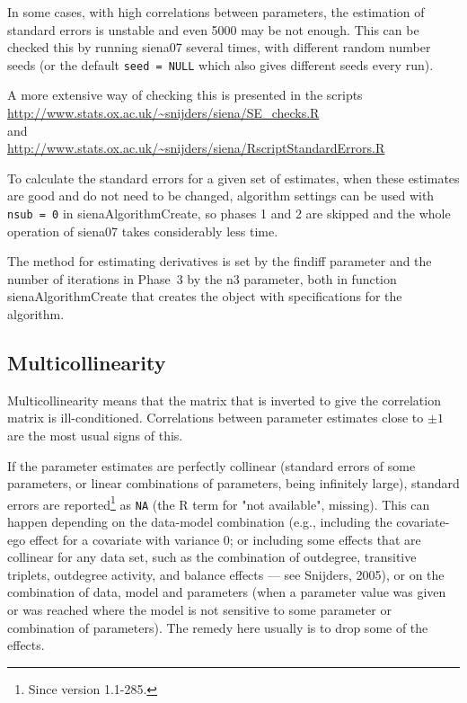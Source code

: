 \documentclass[a4paper,fleqn,11pt]{article}
\newcommand{\+}{\, + \,}
\newcommand{\sfn}[1]{\textsf{#1}}
\begin{document}
In some cases, with high correlations between parameters,
the estimation of standard errors is unstable and even 5000 may be not enough.
This can be checked this by running \textsf{siena07} several times, with different
random number seeds (or the default \texttt{seed = NULL} which also gives different
seeds every run).

A more extensive way of checking this is presented in the scripts\\
{\url{http://www.stats.ox.ac.uk/~snijders/siena/SE_checks.R}~} \\
and \\
{\url{http://www.stats.ox.ac.uk/~snijders/siena/RscriptStandardErrors.R}~}
\medskip


To calculate the standard errors for a
given set of estimates, when these estimates are good and do not need to be changed,
algorithm settings can be used with \texttt{nsub = 0}
in \textsf{sienaAlgorithmCreate}, so phases 1 and 2 are
skipped and the whole operation of \textsf{siena07} takes considerably less time.
\medskip

The method for estimating derivatives is set
by the \sfn{findiff} parameter and the number of iterations in Phase~3
by the \sfn{n3} parameter, both in function \textsf{sienaAlgorithmCreate}
that creates the object with specifications for the algorithm.

\subsection{Multicollinearity}

Multicollinearity means that the matrix that is inverted
to give the correlation matrix is ill-conditioned.
Correlations between parameter estimates
close to $\pm 1$ are the most usual signs of this.

If the parameter estimates are perfectly collinear
(standard errors of some parameters, or linear combinations
of parameters, being infinitely large), standard errors
are reported\footnote{Since version 1.1-285.}
as \texttt{NA} (the R term for "not available", missing).
This can happen depending on the data-model combination
(e.g., including the covariate-ego effect for a covariate with variance 0;
or including some effects that are collinear for any data set,
such as the combination of outdegree, transitive triplets,
outdegree activity, and balance effects --- see Snijders, 2005),
or on the combination of data, model and parameters (when a parameter
value was given or was reached where the model is not sensitive to some
parameter or combination of parameters).
The remedy here usually is to drop some of the effects.
\medskip
\end{document}
